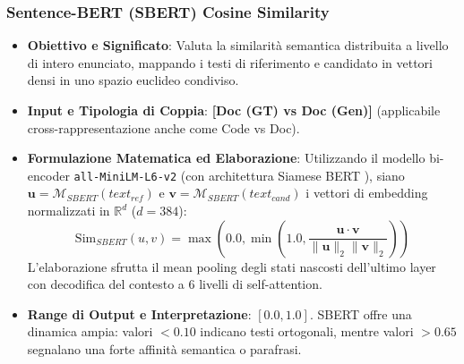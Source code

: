 \subsubsection{Sentence-BERT (SBERT) Cosine Similarity}
\label{subsubsec:sbert}
\begin{itemize}[leftmargin=*, label=\textbullet]
    \item \textbf{Obiettivo e Significato}: Valuta la similarità semantica distribuita a livello di intero enunciato, mappando i testi di riferimento e candidato in vettori densi in uno spazio euclideo condiviso.
    \item \textbf{Input e Tipologia di Coppia}: \textbf{[Doc (GT) vs Doc (Gen)]} (applicabile cross-rappresentazione anche come Code vs Doc).
    \item \textbf{Formulazione Matematica ed Elaborazione}: Utilizzando il modello bi-encoder \texttt{all-MiniLM-L6-v2} (con architettura Siamese BERT \cite{reimers_sentence-bert_2019}), siano $\mathbf{u} = \mathcal{M}_{SBERT}(text_{ref})$ e $\mathbf{v} = \mathcal{M}_{SBERT}(text_{cand})$ i vettori di embedding normalizzati in $\mathbb{R}^d$ ($d=384$):
    \begin{equation}
        \text{Sim}_{SBERT}(u, v) = \max\left(0.0, \min\left(1.0, \frac{\mathbf{u} \cdot \mathbf{v}}{\|\mathbf{u}\|_2 \|\mathbf{v}\|_2}\right)\right)
        \label{eq:sbert_cosine}
    \end{equation}
    L'elaborazione sfrutta il mean pooling degli stati nascosti dell'ultimo layer con decodifica del contesto a 6 livelli di self-attention.
    \item \textbf{Range di Output e Interpretazione}: $[0.0, 1.0]$. SBERT offre una dinamica ampia: valori $< 0.10$ indicano testi ortogonali, mentre valori $> 0.65$ segnalano una forte affinità semantica o parafrasi.
\end{itemize}

